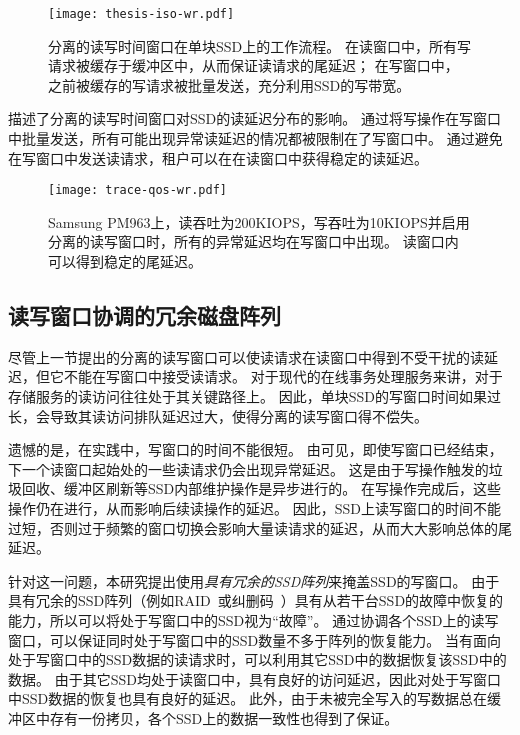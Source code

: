 \begin{figure}[h]
  \centering
  \texttt{[image: thesis-iso-wr.pdf]}
  \caption{
        分离的读写时间窗口在单块SSD上的工作流程。
        在读窗口中，所有写请求被缓存于缓冲区中，从而保证读请求的尾延迟；
        在写窗口中，之前被缓存的写请求被批量发送，充分利用SSD的写带宽。
      }
  \label{fig:design-iso-wr}
\end{figure}

描述了分离的读写时间窗口对SSD的读延迟分布的影响。
通过将写操作在写窗口中批量发送，所有可能出现异常读延迟的情况都被限制在了写窗口中。
通过避免在写窗口中发送读请求，租户可以在在读窗口中获得稳定的读延迟。

\begin{figure}[h]
  \centering
  \texttt{[image: trace-qos-wr.pdf]}
  \caption{
        Samsung PM963上，读吞吐为200KIOPS，写吞吐为10KIOPS并启用分离的读写窗口时，所有的异常延迟均在写窗口中出现。
        读窗口内可以得到稳定的尾延迟。
      }
  \label{fig:design-wr-isolated}
\end{figure}

\subsection{读写窗口协调的冗余磁盘阵列}
\label{sec:design-array-composition}

尽管上一节提出的分离的读写窗口可以使读请求在读窗口中得到不受干扰的读延迟，但它不能在写窗口中接受读请求。
对于现代的在线事务处理服务来讲，对于存储服务的读访问往往处于其关键路径上。
因此，单块SSD的写窗口时间如果过长，会导致其读访问排队延迟过大，使得分离的读写窗口得不偿失。

遗憾的是，在实践中，写窗口的时间不能很短。
由可见，即使写窗口已经结束，下一个读窗口起始处的一些读请求仍会出现异常延迟。
这是由于写操作触发的垃圾回收、缓冲区刷新等SSD内部维护操作是异步进行的。
在写操作完成后，这些操作仍在进行，从而影响后续读操作的延迟。
因此，SSD上读写窗口的时间不能过短，否则过于频繁的窗口切换会影响大量读请求的延迟，从而大大影响总体的尾延迟。

针对这一问题，本研究提出使用\textit{具有冗余的SSD阵列}来掩盖SSD的写窗口。
由于具有冗余的SSD阵列（例如RAID~\cite{patterson1988case}或纠删码~\cite{huang2012erasure}）具有从若干台SSD的故障中恢复的能力，所以可以将处于写窗口中的SSD视为“故障”。
通过协调各个SSD上的读写窗口，可以保证同时处于写窗口中的SSD数量不多于阵列的恢复能力。
当有面向处于写窗口中的SSD数据的读请求时，可以利用其它SSD中的数据恢复该SSD中的数据。
由于其它SSD均处于读窗口中，具有良好的访问延迟，因此对处于写窗口中SSD数据的恢复也具有良好的延迟。
此外，由于未被完全写入的写数据总在缓冲区中存有一份拷贝，各个SSD上的数据一致性也得到了保证。

